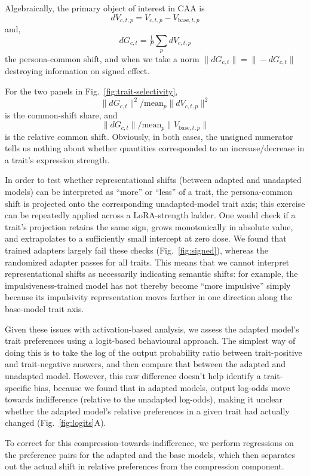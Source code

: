 \documentclass[11pt]{article}
\begin{document}
Algebraically, the primary object of interest in CAA is
\[
dV_{c,t,p} = V_{c,t,p}-V_{\mathrm{base},t,p}
\]
and,
\[
dG_{c,t} = \tfrac{1}{P}\sum_{p}dV_{c,t,p}
\]
the persona-common shift, and when we take a norm $\|dG_{c,t}\| = \|-dG_{c,t}\|$ destroying information on signed effect.

For the two panels in Fig.~\ref{fig:trait-selectivity},
\[
\|dG_{c,t}\|^2\big/\mathrm{mean}_p\|dV_{c,t,p}\|^2
\]
is the common-shift share, and
\[
\|dG_{c,t}\|\big/\mathrm{mean}_p\|V_{\mathrm{base},t,p}\|
\]
is the relative common shift. Obviously, in both cases, the unsigned numerator tells us nothing about whether quantities corresponded to an increase/decrease in a trait's expression strength.

In order to test whether representational shifts (between adapted and unadapted models) can be interpreted as “more” or “less” of a trait, the persona-common shift is projected onto the corresponding unadapted-model trait axis; this exercise can be repeatedly applied across a LoRA-strength ladder. One would check if a trait's projection retains the same sign, grows monotonically in absolute value, and extrapolates to a sufficiently small intercept at zero dose. We found that trained adapters largely fail these checks (Fig.~\ref{fig:signed}), whereas the randomized adapter passes for all traits. This means that we cannot interpret representational shifts as necessarily indicating semantic shifts: for example, the impulsiveness-trained model has not thereby become “more impulsive” simply because its impulsivity representation moves farther in one direction along the base-model trait axis.  

Given these issues with activation-based analysis, we assess the adapted model's trait preferences using a logit-based behavioural approach. The simplest way of doing this is to take the log of the output probability ratio between trait-positive and trait-negative answers, and then compare that between the adapted and unadapted model. However, this raw difference doesn't help identify a trait-specific bias, because we found that in adapted models, output log-odds move towards indifference (relative to the unadapted log-odds), making it unclear whether the adapted model's relative preferences in a given trait had actually changed (Fig.~\ref{fig:logits}A). 

To correct for this compression-towards-indifference, we perform regressions on the preference pairs for the adapted and the base models, which then separates out the actual shift in relative preferences from the compression component. 
\end{document}
